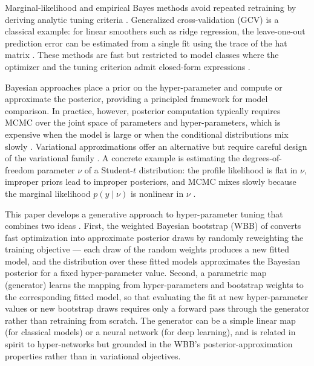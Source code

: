 \documentclass[12pt]{article}
\begin{document}
Marginal-likelihood and empirical Bayes methods avoid repeated retraining by deriving analytic tuning criteria \citep{berger1985statistical}. Generalized cross-validation (GCV) is a classical example: for linear smoothers such as ridge regression, the leave-one-out prediction error can be estimated from a single fit using the trace of the hat matrix \citep{golub1979generalized}. These methods are fast but restricted to model classes where the optimizer and the tuning criterion admit closed-form expressions \citep{golub1979generalized}.

Bayesian approaches place a prior on the hyper-parameter and compute or approximate the posterior, providing a principled framework for model comparison. In practice, however, posterior computation typically requires MCMC over the joint space of parameters and hyper-parameters, which is expensive when the model is large or when the conditional distributions mix slowly \citep{gamerman2006markov}. Variational approximations offer an alternative but require careful design of the variational family \citep{blei2017variational}. A concrete example is estimating the degrees-of-freedom parameter $\nu$ of a Student-$t$ distribution: the profile likelihood is flat in $\nu$, improper priors lead to improper posteriors, and MCMC mixes slowly because the marginal likelihood $p(y\mid\nu)$ is nonlinear in $\nu$ \citep{fonseca2008objective}.

This paper develops a generative approach to hyper-parameter tuning that combines two ideas \citep{nareklishvili2024generative,polson2025generative,nareklishvili2023generative}. First, the weighted Bayesian bootstrap (WBB) of \citet{newton2021weighted} converts fast optimization into approximate posterior draws by randomly reweighting the training objective --- each draw of the random weights produces a new fitted model, and the distribution over these fitted models approximates the Bayesian posterior for a fixed hyper-parameter value. Second, a parametric map (generator) learns the mapping from hyper-parameters and bootstrap weights to the corresponding fitted model, so that evaluating the fit at new hyper-parameter values or new bootstrap draws requires only a forward pass through the generator rather than retraining from scratch. The generator can be a simple linear map (for classical models) or a neural network (for deep learning), and is related in spirit to hyper-networks \citep{ha2017hypernetworks,bhadra2024merging} but grounded in the WBB's posterior-approximation properties rather than in variational objectives.
\end{document}
